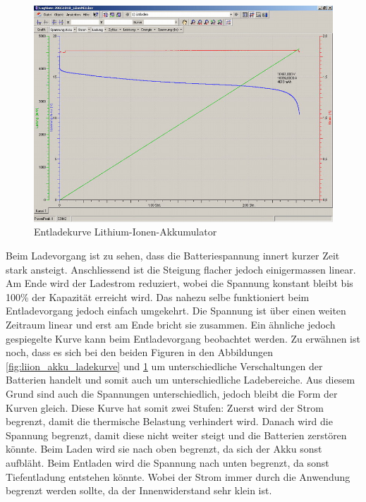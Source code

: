 \begin{figure}[h!]
	\centering
\includegraphics[width=1.0\textwidth]{images/liion_entladekurve.jpg}
	\caption{Entladekurve Lithium-Ionen-Akkumulator \cite{liion_entladekurve}}
\label{fig:liion_akku_entladekurve}
\end{figure}

\newpage

Beim Ladevorgang ist zu sehen, dass die Batteriespannung innert kurzer Zeit stark ansteigt. Anschliessend ist die Steigung flacher jedoch einigermassen linear. Am Ende wird der Ladestrom reduziert, wobei die Spannung konstant bleibt bis 100\% der Kapazität erreicht wird.
Das nahezu selbe funktioniert beim Entladevorgang jedoch einfach umgekehrt. Die Spannung ist über einen weiten Zeitraum linear und erst am Ende bricht sie zusammen. Ein ähnliche jedoch gespiegelte Kurve kann beim Entladevorgang beobachtet werden.
Zu erwähnen ist noch, dass es sich bei den beiden Figuren in den Abbildungen \ref{fig:liion_akku_ladekurve} und \ref{fig:liion_akku_entladekurve} um unterschiedliche Verschaltungen der Batterien handelt und somit auch um unterschiedliche Ladebereiche. Aus diesem Grund sind auch die Spannungen unterschiedlich, jedoch bleibt die Form der Kurven gleich. Diese Kurve hat somit zwei Stufen: Zuerst wird der Strom begrenzt, damit die thermische Belastung verhindert wird. Danach wird die Spannung begrenzt, damit diese nicht weiter steigt und die Batterien zerstören könnte. Beim Laden wird sie nach oben begrenzt, da sich der Akku sonst aufbläht. Beim Entladen wird die Spannung nach unten begrenzt, da sonst Tiefentladung entstehen könnte. Wobei der Strom immer durch die Anwendung begrenzt werden sollte, da der Innenwiderstand sehr klein ist.

